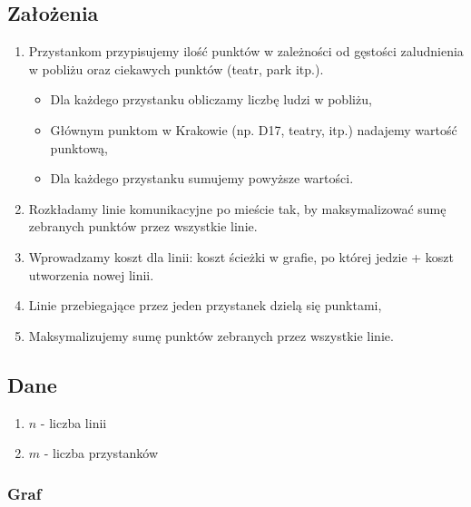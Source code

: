 \documentclass[12pt,a4paper,openright]{mwrep}
\begin{document}
\subsection{Założenia}

\begin{enumerate}
	\item Przystankom przypisujemy ilość punktów w zależności od gęstości zaludnienia w pobliżu oraz ciekawych punktów (teatr, park itp.).
	\begin{itemize}
		\item Dla każdego przystanku obliczamy liczbę ludzi w pobliżu,
		\item Głównym punktom w Krakowie (np. D17, teatry, itp.) nadajemy wartość punktową,
		\item Dla każdego przystanku sumujemy powyższe wartości.
	\end{itemize}
	\item Rozkładamy linie komunikacyjne po mieście tak, by maksymalizować sumę zebranych punktów przez wszystkie linie.
	\item Wprowadzamy koszt dla linii: koszt ścieżki w grafie, po której jedzie + koszt utworzenia nowej linii.
	\item Linie przebiegające przez jeden przystanek dzielą się punktami,
	\item Maksymalizujemy sumę punktów zebranych przez wszystkie linie.
\end{enumerate}

\subsection{Dane}
	\begin{enumerate}
		\item $n$ - liczba linii
		\item $m$ - liczba przystanków
	\end{enumerate}

\subsubsection{Graf}
\end{document}
